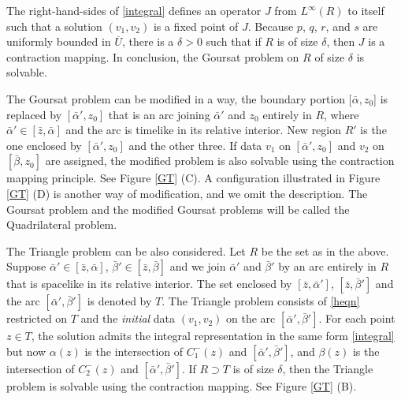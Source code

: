 \documentclass[11pt]{amsart}
\theoremstyle{plain}
\theoremstyle{remark}
\numberwithin{equation}{section}
\numberwithin{Thm}{section}
\def\U{\overline{U}}
\begin{document}
The right-hand-sides of \eqref{integral} defines an operator $J$ from $L^\infty(R)$ to itself such that a solution $(v_1,v_2)$ is a fixed point of $J$. Because $p$, $q$, $r$, and $s$ are uniformly bounded in $\U$, there is a $\delta>0$ such that if $R$ is of size $\delta$, then $J$ is a contraction mapping. In conclusion, the Goursat problem on $R$ of size $\delta$ is solvable.

The Goursat problem can be modified in a way, the boundary portion $[\bar\alpha, z_0$] is replaced by $[\bar\alpha', z_0]$ that is an arc joining $\bar\alpha'$ and $z_0$ entirely in $R$, where $\bar\alpha' \in [\bar z, \bar\alpha]$ and the arc is timelike in its relative interior. New region $R'$ is the one enclosed by $[\bar\alpha', z_0]$ and the other three. If data $v_1$ on $[\bar\alpha',z_0]$ and $v_2$ on $[\bar\beta,z_0]$ are assigned, the modified problem is also solvable using the contraction mapping principle. See Figure \ref{GT} (C). A configuration illustrated in Figure \ref{GT} (D) is another way of modification, and we omit the description. The Goursat problem and the modified Goursat problems will be called the Quadrilateral problem. %

The Triangle problem can be also considered. Let $R$ be the set as in the above. Suppose $\bar\alpha' \in [\bar z, \bar\alpha]$, $\bar\beta' \in [\bar z, \bar\beta]$ and we join $\bar\alpha'$ and $\bar\beta'$ by an arc entirely in $R$ that is spacelike in its relative interior. The set enclosed by $[\bar z,\bar\alpha']$, $[\bar z,\bar\beta']$ and the arc $[\bar\alpha',\bar\beta']$ is denoted by $T$. The Triangle problem consists of \eqref{heqn} restricted on $T$ and the {\it initial} data $(v_1,v_2)$ on the arc $[\bar\alpha',\bar\beta']$. For each point $z\in T$, the solution admits the integral representation in the same form \eqref{integral} but now $\alpha(z)$ is the intersection of $C^-_1(z)$ and $[\bar \alpha', \bar\beta']$, and $\beta(z)$ is the intersection of $C^-_2(z)$ and $[\bar \alpha', \bar\beta']$. If $R\supset T$ is of size $\delta$, then the Triangle problem is solvable using the contraction mapping. See Figure \ref{GT} (B).
\end{document}
